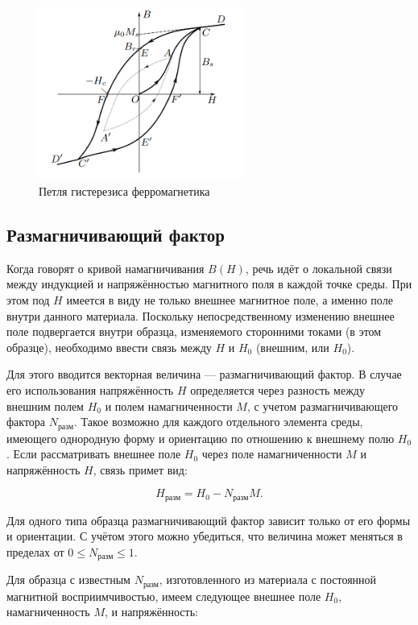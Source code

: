 \documentclass[12pt,a4paper]{article}
\begin{document}
\begin{figure}[h!]
    \centering
    \includegraphics[width=0.6\textwidth]{hysteresis_loop.png}
    \caption{Петля гистерезиса ферромагнетика}
\end{figure}


\subsection{Размагничивающий фактор}

Когда говорят о кривой намагничивания \(B(H)\), речь идёт о локальной связи между индукцией и напряжённостью магнитного поля в каждой точке среды. При этом под \(H\) имеется в виду не только внешнее магнитное поле, а именно поле внутри данного материала. Поскольку непосредственному изменению внешнее поле подвергается внутри образца, изменяемого сторонними токами (в этом образце), необходимо ввести связь между \(H\) и \(H_0\) (внешним, или \(H_0\)).

Для этого вводится векторная величина — размагничивающий фактор. В случае его использования напряжённость \(H\) определяется через разность между внешним полем \(H_0\) и полем намагниченности \(M\), с учетом размагничивающего фактора \(N_{\text{разм}}\). Такое возможно для каждого отдельного элемента среды, имеющего однородную форму и ориентацию по отношению к внешнему полю \(H_0\). Если рассматривать внешнее поле \(H_0\) через поле намагниченности \(M\) и напряжённость \(H\), связь примет вид:

\[
H_{\text{разм}} = H_0 - N_{\text{разм}} M.
\]



Для одного типа образца размагничивающий фактор зависит только от его формы и ориентации. С учётом этого можно убедиться, что величина может меняться в пределах от \(0 \leq N_{\text{разм}} \leq 1\).

Для образца с известным \(N_{\text{разм}}\), изготовленного из материала с постоянной магнитной восприимчивостью, имеем следующее внешнее поле \(H_0\), намагниченность \(M\), и напряжённость:
\end{document}
